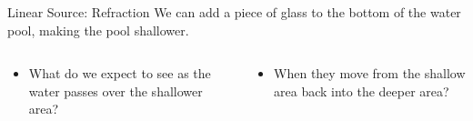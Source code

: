 \documentclass{beamer}
\begin{document}
\begin{frame}{Linear Source: Refraction}
    We can add a piece of glass to the bottom of the water pool, making the pool shallower.
    \begin{columns}[T]
        \begin{column}{.45\textwidth}
            \begin{itemize}
                \item What do we expect to see as the water passes over the shallower area?
            \end{itemize}
        \end{column}
         \begin{column}{.45\textwidth}
           \begin{itemize}
                \item When they move from the shallow area back into the deeper area?
            \end{itemize}
         \end{column}
    \end{columns}
\end{frame}
\end{document}
